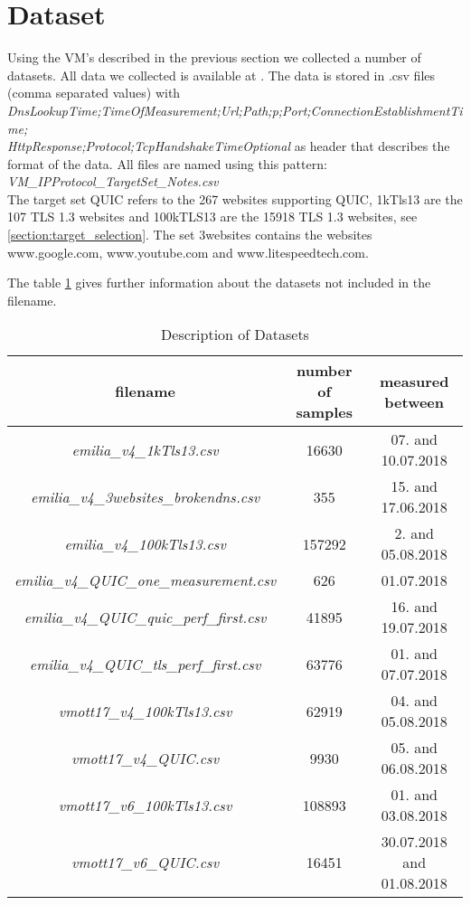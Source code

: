 \section{Dataset}
\label{section:dataset}

Using the VM's described in the previous section we collected a number of datasets.
All data we collected is available at \cite{Link:CSVData}.
The data is stored in .csv files (comma separated values) with\\
\textit{DnsLookupTime;TimeOfMeasurement;Url;Path;p;Port;ConnectionEstablishmentTime;}\\
\textit{HttpResponse;Protocol;TcpHandshakeTimeOptional}
as header that describes the format of the data.
All files are named using this pattern:\\
\textit{VM\_IPProtocol\_TargetSet\_Notes.csv}\\
The target set QUIC refers to the 267 websites supporting QUIC, 1kTls13 are the 107 TLS 1.3 websites and 100kTLS13 are the 15918 TLS 1.3 websites, see \ref{section:target_selection}.
The set 3websites contains the websites www.google.com, www.youtube.com and www.litespeedtech.com.

The table \ref{tab:Files} gives further information about the datasets not included in the filename.

\begin{table}[!htb]
\centering
\caption{Description of Datasets}
\begin{tabular}{| c | c | c |}
\hline
filename & number of samples & measured between \\
\hline
\textit{emilia\_v4\_1kTls13.csv} & 16630 &  07. and 10.07.2018\\
\hline
\textit{emilia\_v4\_3websites\_brokendns.csv} & 355 & 15. and 17.06.2018\\
\hline
\textit{emilia\_v4\_100kTls13.csv} & 157292 & 2. and 05.08.2018\\
\hline
\textit{emilia\_v4\_QUIC\_one\_measurement.csv} & 626 & 01.07.2018\\
\hline
\textit{emilia\_v4\_QUIC\_quic\_perf\_first.csv} & 41895 & 16. and 19.07.2018\\
\hline
\textit{emilia\_v4\_QUIC\_tls\_perf\_first.csv} & 63776 & 01. and 07.07.2018\\
\hline
\textit{vmott17\_v4\_100kTls13.csv} & 62919 & 04. and 05.08.2018\\
\hline
\textit{vmott17\_v4\_QUIC.csv} & 9930 & 05. and 06.08.2018\\
\hline
\textit{vmott17\_v6\_100kTls13.csv} & 108893 & 01. and 03.08.2018\\
\hline
\textit{vmott17\_v6\_QUIC.csv} & 16451 & 30.07.2018 and 01.08.2018\\
\hline
\end{tabular}
\label{tab:Files}
\end{table}

